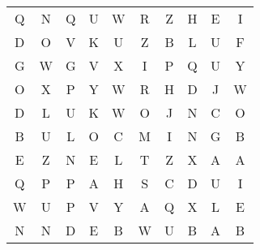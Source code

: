 \documentclass{standalone}
\begin{document}
\begin{center}
\renewcommand{\arraystretch}{1.5}{
\noindent\begin{tabular}{cccccccccc}Q & N & Q & U & W & R & Z & H & E & I \\ 
D & O & V & K & U & Z & B & L & U & F \\ 
G & W & G & V & X & I & P & Q & U & Y \\ 
O & X & P & Y & W & R & H & D & J & W \\ 
D & L & U & K & W & O & J & N & C & O \\ 
B & U & L & O & C & M & I & N & G & B \\ 
E & Z & N & E & L & T & Z & X & A & A \\ 
Q & P & P & A & H & S & C & D & U & I \\ 
W & U & P & V & Y & A & Q & X & L & E \\ 
N & N & D & E & B & W & U & B & A & B
\end{tabular}
}
\end{center}
\end{document}
